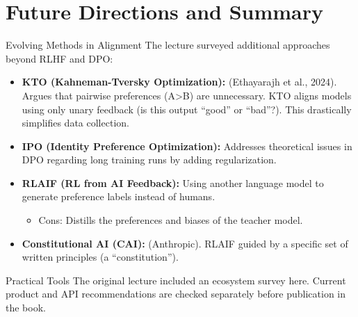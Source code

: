 \documentclass[xcolor=svgnames, 10pt, handout]{beamer}
\begin{document}
\section{Future Directions and Summary}

\begin{frame}{Evolving Methods in Alignment}
    The lecture surveyed additional approaches beyond RLHF and DPO:
    \pause

    \begin{itemize}
        \item \textbf{KTO (Kahneman-Tversky Optimization):} (Ethayarajh et al., 2024). Argues that pairwise preferences (A>B) are unnecessary. KTO aligns models using only unary feedback (is this output ``good'' or ``bad''?). This drastically simplifies data collection.
        \pause
        \item \textbf{IPO (Identity Preference Optimization):} Addresses theoretical issues in DPO regarding long training runs by adding regularization.
        \pause
        \item \textbf{RLAIF (RL from AI Feedback):} Using another language model to generate preference labels instead of humans.
        \begin{itemize}
            \item Cons: Distills the preferences and biases of the teacher model.
        \end{itemize}
        \pause
        \item \textbf{Constitutional AI (CAI):} (Anthropic). RLAIF guided by a specific set of written principles (a ``constitution'').
    \end{itemize}
\end{frame}

\begin{frame}{Practical Tools}
    The original lecture included an ecosystem survey here. Current product and API
    recommendations are checked separately before publication in the book.
\end{frame}
\end{document}
